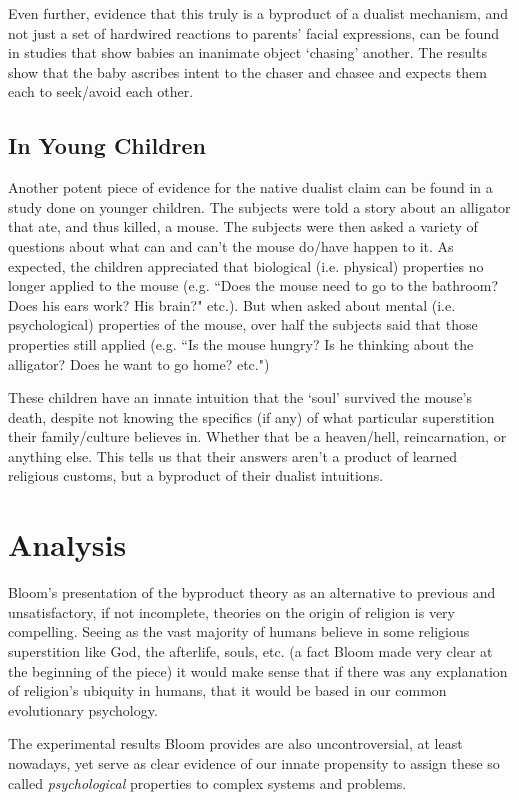 \documentclass{article}
\begin{document}
Even further, evidence that this truly is a byproduct of a dualist mechanism, and not just a set of hardwired reactions to parents' facial expressions, can be found in studies that show babies an inanimate object `chasing' another. The results show that the baby ascribes intent to the chaser and chasee and expects them each to seek/avoid each other.

\subsection{In Young Children}
Another potent piece of evidence for the native dualist claim can be found in a study done on younger children. The subjects were told a story about an alligator that ate, and thus killed, a mouse. The subjects were then asked a variety of questions about what can and can't the mouse do/have happen to it. As expected, the children appreciated that biological (i.e. physical) properties no longer applied to the mouse (e.g. ``Does the mouse need to go to the bathroom? Does his ears work? His brain?" etc.). But when asked about mental (i.e. psychological) properties of the mouse, over half the subjects said that those properties still applied (e.g. ``Is the mouse hungry? Is he thinking about the alligator? Does he want to go home? etc.")

These children have an innate intuition that the `soul' survived the mouse's death, despite not knowing the specifics (if any) of what particular superstition their family/culture believes in. Whether that be a heaven/hell, reincarnation, or anything else. This tells us that their answers aren't a product of learned religious customs, but a byproduct of their dualist intuitions.

\section{Analysis}
Bloom's presentation of the byproduct theory as an alternative to previous and unsatisfactory, if not incomplete, theories on the origin of religion is very compelling. Seeing as the vast majority of humans believe in some religious superstition like God, the afterlife, souls, etc. (a fact Bloom made very clear at the beginning of the piece) it would make sense that if there was any explanation of religion's ubiquity in humans, that it would be based in our common evolutionary psychology.

The experimental results Bloom provides are also uncontroversial, at least nowadays, yet serve as clear evidence of our innate propensity to assign these so called \emph{psychological} properties to complex systems and problems.
\end{document}
